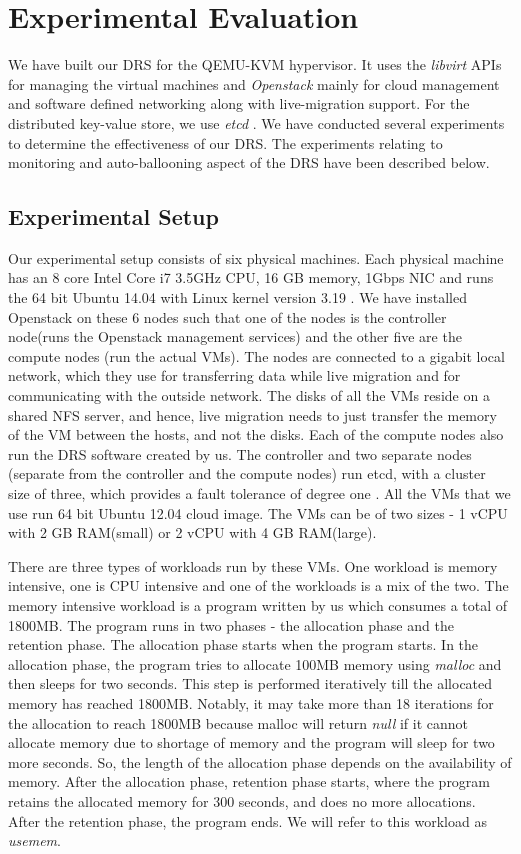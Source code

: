 \chapter{Experimental Evaluation}
\label{chap:experiment}
We have built our DRS for the QEMU-KVM hypervisor. It uses the \textit{libvirt} APIs for managing the virtual machines and \textit{Openstack} \cite{openstack} mainly for cloud management and software defined networking along with live-migration support. For the distributed key-value store, we use \textit{etcd} \cite{etcd}. We have conducted several experiments to determine the effectiveness of our DRS. The experiments relating to monitoring and auto-ballooning aspect of the DRS have been described below.

\section{Experimental Setup}
Our experimental setup consists of six physical machines. Each physical machine has an 8 core Intel Core i7 3.5GHz CPU, 16 GB memory, 1Gbps NIC and runs the 64 bit Ubuntu 14.04 with Linux kernel version 3.19 . We have installed Openstack on these 6 nodes such that one of the nodes is the controller node(runs the Openstack management services) and the other five are the compute nodes (run the actual VMs). The nodes are connected to a gigabit local network, which they use for transferring data while live migration and for communicating with the outside network. The disks of all the VMs reside on a shared NFS server, and hence, live migration needs to just transfer the memory of the VM between the hosts, and not the disks. Each of the compute nodes also run the DRS software created by us. The controller and two separate nodes (separate from the controller and the compute nodes) run etcd, with a cluster size of three, which provides a fault tolerance of degree one \cite{etcd-ad}. All the VMs that we use run 64 bit Ubuntu 12.04 cloud image. The VMs can be of two sizes - 1 vCPU with 2 GB RAM(small) or 2 vCPU with 4 GB RAM(large).

There are three types of workloads run by these VMs. One workload is memory intensive, one is CPU intensive and one of the workloads is a mix of the two. The memory intensive workload is a program written by us which consumes a total of 1800MB. The program runs in two phases - the allocation phase and the retention phase. The allocation phase starts when the program starts. In the allocation phase, the program tries to allocate 100MB memory using \textit{malloc} and then sleeps for two seconds. This step is performed iteratively till the allocated memory has reached 1800MB. Notably, it may take more than 18 iterations for the allocation to reach 1800MB because malloc will return \textit{null} if it cannot allocate memory due to shortage of memory and the program will sleep for two more seconds. So, the length of the allocation phase depends on the availability of memory. After the allocation phase, retention phase starts, where the program retains the allocated memory for 300 seconds, and does no more allocations. After the retention phase, the program ends. We will refer to this workload as \textit{usemem}.

